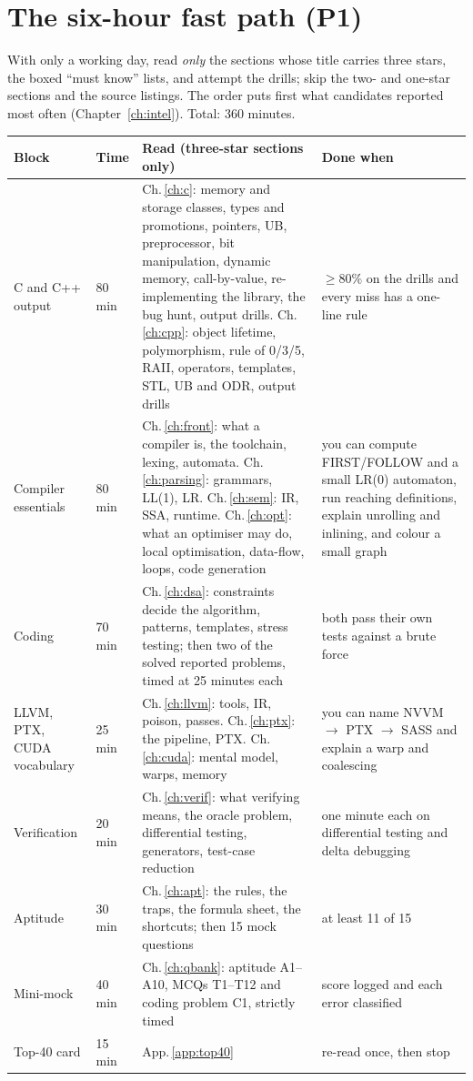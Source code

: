 \documentclass[10pt,a4paper,openany,oneside]{report}
\newcommand{\prio}[1]{\texorpdfstring{\ifcase#1\or{\color{gold}\ding{72}}\or{\color{gold}\ding{72}\ding{72}}\or{\color{gold}\ding{72}\ding{72}\ding{72}}\fi}{}}
\begin{document}
\section{The six-hour fast path (P1) \prio{3}}\label{sec:fast}
With only a working day, read \emph{only} the sections whose title carries three stars, the boxed ``must know'' lists, and attempt the drills; skip the two- and one-star sections and the source listings. The order puts first what candidates reported most often (Chapter~\ref{ch:intel}). Total: 360 minutes.
\begin{center}\small
\begin{xltabular}{\textwidth}{@{}L{2.5cm}L{1.3cm}L{5.4cm}Y@{}}
\toprule
\textbf{Block} & \textbf{Time} & \textbf{Read (three-star sections only)} & \textbf{Done when}\\
\midrule\endhead
C and C++ output & 80 min & Ch.\,\ref{ch:c}: memory and storage classes, types and promotions, pointers, UB, preprocessor, bit manipulation, dynamic memory, call-by-value, re-implementing the library, the bug hunt, output drills. Ch.\,\ref{ch:cpp}: object lifetime, polymorphism, rule of 0/3/5, RAII, operators, templates, STL, UB and ODR, output drills & $\ge80\%$ on the drills and every miss has a one-line rule\\
Compiler essentials & 80 min & Ch.\,\ref{ch:front}: what a compiler is, the toolchain, lexing, automata. Ch.\,\ref{ch:parsing}: grammars, LL(1), LR. Ch.\,\ref{ch:sem}: IR, SSA, runtime. Ch.\,\ref{ch:opt}: what an optimiser may do, local optimisation, data-flow, loops, code generation & you can compute FIRST/FOLLOW and a small LR(0) automaton, run reaching definitions, explain unrolling and inlining, and colour a small graph\\
Coding & 70 min & Ch.\,\ref{ch:dsa}: constraints decide the algorithm, patterns, templates, stress testing; then two of the solved reported problems, timed at 25 minutes each & both pass their own tests against a brute force\\
LLVM, PTX, CUDA vocabulary & 25 min & Ch.\,\ref{ch:llvm}: tools, IR, poison, passes. Ch.\,\ref{ch:ptx}: the pipeline, PTX. Ch.\,\ref{ch:cuda}: mental model, warps, memory & you can name NVVM $\to$ PTX $\to$ SASS and explain a warp and coalescing\\
Verification & 20 min & Ch.\,\ref{ch:verif}: what verifying means, the oracle problem, differential testing, generators, test-case reduction & one minute each on differential testing and delta debugging\\
Aptitude & 30 min & Ch.\,\ref{ch:apt}: the rules, the traps, the formula sheet, the shortcuts; then 15 mock questions & at least 11 of 15\\
Mini-mock & 40 min & Ch.\,\ref{ch:qbank}: aptitude A1--A10, MCQs T1--T12 and coding problem C1, strictly timed & score logged and each error classified\\
Top-40 card & 15 min & App.\,\ref{app:top40} & re-read once, then stop\\
\bottomrule
\end{xltabular}
\end{center}
\end{document}
